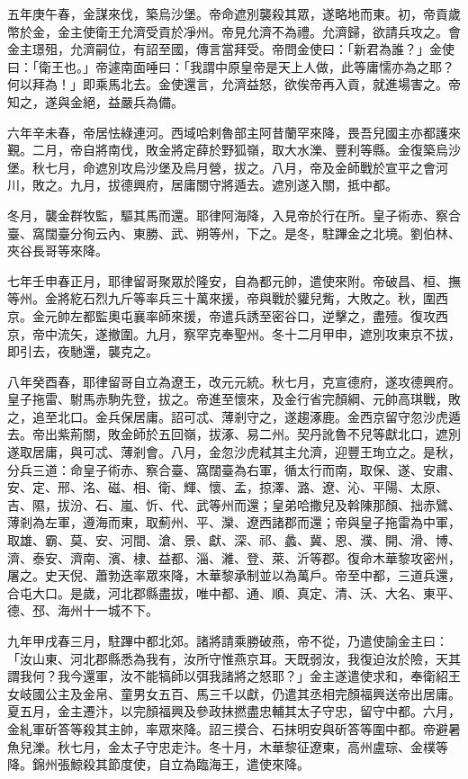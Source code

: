 \begin{pinyinscope}
 五年庚午春，金謀來伐，築烏沙堡。帝命遮別襲殺其眾，遂略地而東。初，帝貢歲幣於金，金主使衛王允濟受貢於凈州。帝見允濟不為禮。允濟歸，欲請兵攻之。會金主璟殂，允濟嗣位，有詔至國，傳言當拜受。帝問金使曰：「新君為誰？」金使曰：「衛王也。」帝遽南面唾曰：「我謂中原皇帝是天上人做，此等庸懦亦為之耶？何以拜為！」即乘馬北去。金使還言，允濟益怒，欲俟帝再入貢，就進場害之。帝知之，遂與金絕，益嚴兵為備。



 六年辛未春，帝居怯綠連河。西域哈剌魯部主阿昔蘭罕來降，畏吾兒國主亦都護來覲。二月，帝自將南伐，敗金將定薛於野狐嶺，取大水濼、豐利等縣。金復築烏沙堡。秋七月，命遮別攻烏沙堡及烏月營，拔之。八月，帝及金師戰於宣平之會河川，敗之。九月，拔德興府，居庸關守將遁去。遮別遂入關，抵中都。



 冬月，襲金群牧監，驅其馬而還。耶律阿海降，入見帝於行在所。皇子術赤、察合臺、窩闊臺分徇云內、東勝、武、朔等州，下之。是冬，駐蹕金之北境。劉伯林、夾谷長哥等來降。



 七年壬申春正月，耶律留哥聚眾於隆安，自為都元帥，遣使來附。帝破昌、桓、撫等州。金將紇石烈九斤等率兵三十萬來援，帝與戰於貛兒觜，大敗之。秋，圍西京。金元帥左都監奧屯襄率師來援，帝遣兵誘至密谷口，逆擊之，盡殪。復攻西京，帝中流矢，遂撤圍。九月，察罕克奉聖州。冬十二月甲申，遮別攻東京不拔，即引去，夜馳還，襲克之。



 八年癸酉春，耶律留哥自立為遼王，改元元統。秋七月，克宣德府，遂攻德興府。皇子拖雷、駙馬赤駒先登，拔之。帝進至懷來，及金行省完顏綱、元帥高琪戰，敗之，追至北口。金兵保居庸。詔可忒、薄剎守之，遂趨涿鹿。金西京留守忽沙虎遁去。帝出紫荊關，敗金師於五回嶺，拔涿、易二州。契丹訛魯不兒等獻北口，遮別遂取居庸，與可忒、薄剎會。八月，金忽沙虎弒其主允濟，迎豐王珣立之。是秋，分兵三道：命皇子術赤、察合臺、窩闊臺為右軍，循太行而南，取保、遂、安肅、安、定、邢、洺、磁、相、衛、輝、懷、孟，掠澤、潞、遼、沁、平陽、太原、吉、隰，拔汾、石、嵐、忻、代、武等州而還；皇弟哈撒兒及斡陳那顏、拙赤鷿、薄剎為左軍，遵海而東，取薊州、平、灤、遼西諸郡而還；帝與皇子拖雷為中軍，取雄、霸、莫、安、河間、滄、景、獻、深、祁、蠡、冀、恩、濮、開、滑、博、濟、泰安、濟南、濱、棣、益都、淄、濰、登、萊、沂等郡。復命木華黎攻密州，屠之。史天倪、蕭勃迭率眾來降，木華黎承制並以為萬戶。帝至中都，三道兵還，合屯大口。是歲，河北郡縣盡拔，唯中都、通、順、真定、清、沃、大名、東平、德、邳、海州十一城不下。



 九年甲戌春三月，駐蹕中都北郊。諸將請乘勝破燕，帝不從，乃遣使諭金主曰：「汝山東、河北郡縣悉為我有，汝所守惟燕京耳。天既弱汝，我復迫汝於險，天其謂我何？我今還軍，汝不能犒師以弭我諸將之怒耶？」金主遂遣使求和，奉衛紹王女岐國公主及金帛、童男女五百、馬三千以獻，仍遣其丞相完顏福興送帝出居庸。夏五月，金主遷汴，以完顏福興及參政抹撚盡忠輔其太子守忠，留守中都。六月，金糺軍斫答等殺其主帥，率眾來降。詔三摸合、石抹明安與斫答等圍中都。帝避暑魚兒濼。秋七月，金太子守忠走汴。冬十月，木華黎征遼東，高州盧琮、金樸等降。錦州張鯨殺其節度使，自立為臨海王，遣使來降。




\end{pinyinscope}
